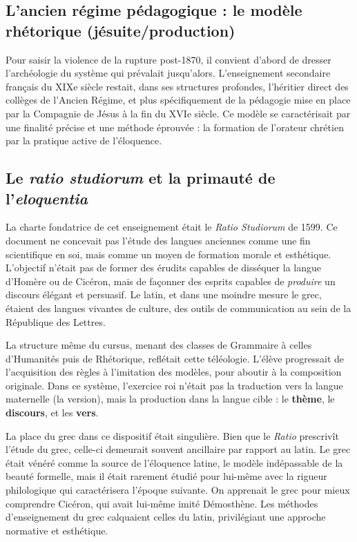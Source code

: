 \subsection{L'ancien régime pédagogique : le modèle rhétorique (jésuite/production)}

Pour saisir la violence de la rupture post-1870, il convient d'abord de dresser l'archéologie du
système qui prévalait jusqu'alors. L'enseignement secondaire français du XIXe siècle restait, dans
ses structures profondes, l'héritier direct des collèges de l'Ancien Régime, et plus spécifiquement
de la pédagogie mise en place par la Compagnie de Jésus à la fin du XVIe siècle.\cite{I-1-1-ref4} Ce
modèle se caractérisait par une finalité précise et une méthode éprouvée : la formation de l'orateur
chrétien par la pratique active de l'éloquence.



\subsection{Le \textit{ratio studiorum} et la primauté de l'\textit{eloquentia}}

La charte fondatrice de cet enseignement était le \textit{Ratio Studiorum} de 1599. Ce document ne
concevait pas l'étude des langues anciennes comme une fin scientifique en soi, mais comme un moyen
de formation morale et esthétique. L'objectif n'était pas de former des érudits capables de
disséquer la langue d'Homère ou de Cicéron, mais de façonner des esprits capables de
\textit{produire} un discours élégant et persuasif. Le latin, et dans une moindre mesure le grec,
étaient des langues vivantes de culture, des outils de communication au sein de la République des
Lettres.\cite{I-1-1-ref4}

La structure même du cursus, menant des classes de Grammaire à celles d'Humanités puis de
Rhétorique, reflétait cette téléologie. L'élève progressait de l'acquisition des règles à
l'imitation des modèles, pour aboutir à la composition originale. Dans ce système, l'exercice roi
n'était pas la traduction vers la langue maternelle (la version), mais la production dans la langue
cible : le \textbf{thème}, le \textbf{discours}, et les \textbf{vers}.\cite{I-1-1-ref6}

La place du grec dans ce dispositif était singulière. Bien que le \textit{Ratio} prescrivît l'étude
du grec, celle-ci demeurait souvent ancillaire par rapport au latin. Le grec était vénéré comme la
source de l'éloquence latine, le modèle indépassable de la beauté formelle, mais il était rarement
étudié pour lui-même avec la rigueur philologique qui caractérisera l'époque suivante. On apprenait
le grec pour mieux comprendre Cicéron, qui avait lui-même imité Démosthène.\cite{I-1-1-ref8} Les
méthodes d'enseignement du grec calquaient celles du latin, privilégiant une approche normative et
esthétique.



